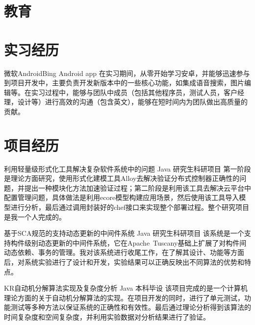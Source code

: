 \documentclass[11pt,a4paper]{moderncv}
\title{}               %
\begin{document}
\maketitle

\section{教育}

\section{实习经历}
{微软}{Android}{Bing Android app}{}
{在实习期间，从零开始学习安卓，并能够迅速参与到项目开发中，主要负责开发新版本中的一些核心功能，如集成语音搜索，图片编辑等。在实习过程中，能够与团队中成员（包括其他程序员，测试人员，客户经理，设计等）进行高效的沟通（包含英文），能够在短时间内为团队做出高质量的贡献。}

\section{项目经历}
\renewcommand{\baselinestretch}{1.2}

{利用轻量级形式化工具解决复杂软件系统中的问题}
{Java}
{研究生科研项目}{}
{第一阶段是理论方面研究，使用形式化建模工具Alloy去解决验证分布式控制器正确性的问题，并提出一种模块化方法加速验证过程；第二阶段是利用该工具去解决云平台中配置管理问题，具体做法是利用ecore模型构建应用场景，然后使用该工具导入模型进行分析，最后通过调用封装好的chef接口来实现整个部署过程。整个研究项目是我一个人完成的。}

\vspace*{0.2\baselineskip}
{基于SCA规范的支持动态更新的中间件系统}
{Java}
{研究生科研项目}{}
{该系统是一个支持构件级别动态更新的中间件系统，它在Apache~Tuscany基础上扩展了对构件间动态依赖、事务的管理。我对该系统进行收尾工作，在了解其设计、功能等方面后，对系统实验进行了设计和开发，实验结果可以正确反映出不同算法的优势和特点。}

\vspace*{0.2\baselineskip}
{KR自动机分解算法实现及复杂度分析}
{Java}
{本科毕设}{}
{该项目完成的是一个计算机理论方面的关于自动机分解算法的实现。在项目开发的同时，进行了单元测试，功能测试等多种方法以保证系统的正确性和有效性。最后通过理论分析得到该算法的时间复杂度和空间复杂度，并利用实验数据对分析结果进行了验证。}
\end{document}
